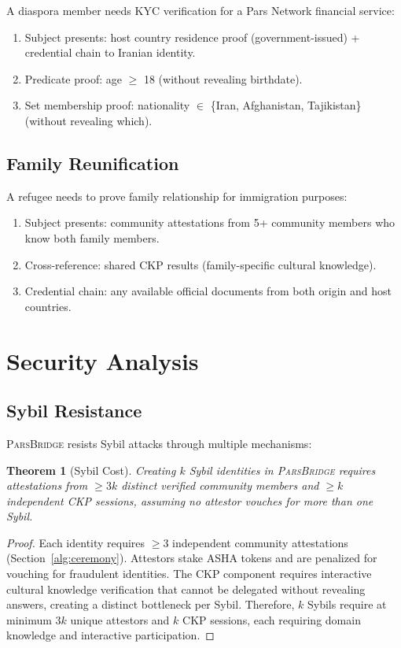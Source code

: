 \documentclass[11pt,a4paper]{article}
\newcommand{\bridge}{\textsc{ParsBridge}\xspace}
\newtheorem{theorem}{Theorem}
\begin{document}
A diaspora member needs KYC verification for a Pars Network financial service:

\begin{enumerate}
    \item Subject presents: host country residence proof (government-issued) + credential chain to Iranian identity.
    \item Predicate proof: age $\geq$ 18 (without revealing birthdate).
    \item Set membership proof: nationality $\in$ \{Iran, Afghanistan, Tajikistan\} (without revealing which).
\end{enumerate}

\subsection{Family Reunification}

A refugee needs to prove family relationship for immigration purposes:

\begin{enumerate}
    \item Subject presents: community attestations from 5+ community members who know both family members.
    \item Cross-reference: shared CKP results (family-specific cultural knowledge).
    \item Credential chain: any available official documents from both origin and host countries.
\end{enumerate}

\section{Security Analysis}

\subsection{Sybil Resistance}

\bridge resists Sybil attacks through multiple mechanisms:

\begin{theorem}[Sybil Cost]
Creating $k$ Sybil identities in \bridge requires attestations from $\geq 3k$ distinct verified community members and $\geq k$ independent CKP sessions, assuming no attestor vouches for more than one Sybil.
\end{theorem}

\begin{proof}
Each identity requires $\geq 3$ independent community attestations (Section~\ref{alg:ceremony}). Attestors stake ASHA tokens and are penalized for vouching for fraudulent identities. The CKP component requires interactive cultural knowledge verification that cannot be delegated without revealing answers, creating a distinct bottleneck per Sybil. Therefore, $k$ Sybils require at minimum $3k$ unique attestors and $k$ CKP sessions, each requiring domain knowledge and interactive participation.
\end{proof}
\end{document}
